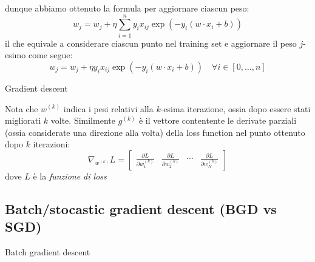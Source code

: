 dunque abbiamo ottenuto la formula per aggiornare ciascun peso:
\[
	w_j = w_j +\eta \sum_{i=1}^n y_i x_{ij} \exp \left(-y_i (w\cdot x_i + b)\right)
\]
il che equivale a considerare ciascun punto nel training set e aggiornare il peso $ j $-esimo come segue:
\[
	w_j = w_j +\eta y_i x_{ij} \exp \left(-y_i (w\cdot x_i + b)\right) \quad \forall i \in \left[0,\ldots ,n\right]
\]

\begin{algoritmo}{Gradient descent}
	\begin{algorithm}[H]

		\vskip3mm
	\end{algorithm}
\end{algoritmo}
Nota che $ w^{\left(k\right)} $ indica i pesi relativi alla $ k $-esima iterazione, ossia dopo essere stati migliorati $ k $ volte. Similmente $ g^{\left(k\right)} $ è il vettore contentente le derivate parziali (ossia considerate una direzione alla volta) della loss function nel punto ottenuto dopo $ k $ iterazioni:
\[
	\nabla_{w^{\left(k\right)}} L
	=
	\begin{bmatrix}
		\displaystyle \frac{\partial L}{\partial w_{1}^{\left(k\right)}} &
		\displaystyle \frac{\partial L}{\partial w_{2}^{\left(k\right)}} &
		\cdots                                                           &
		\displaystyle \frac{\partial L}{\partial w_{N}^{\left(k\right)}}
	\end{bmatrix}
\]
dove $ L $ è la \textit{funzione di loss}
\subsection{Batch/stocastic gradient descent (BGD vs SGD)}
\begin{algoritmo}{Batch gradient descent}
	\begin{algorithm}[H]
		\vskip3mm

	\end{algorithm}
\end{algoritmo}

